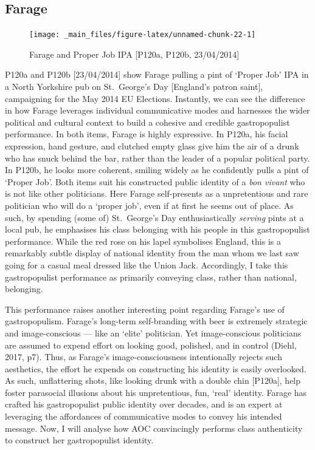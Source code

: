 \documentclass[a4paper, nobind]{templates/ociamthesis}
\begin{document}
\hypertarget{farage-3}{%
\subsection*{Farage}\label{farage-3}}

\begin{figure}
\texttt{[image: \_main\_files/figure-latex/unnamed-chunk-22-1]} \caption{Farage and Proper Job IPA [P120a, P120b, 23/04/2014]}\label{fig:unnamed-chunk-22}
\end{figure}

P120a and P120b {[}23/04/2014{]} show Farage pulling a pint of `Proper Job' IPA in a North Yorkshire pub on St.~George's Day {[}England's patron saint{]}, campaigning for the May 2014 EU Elections. Instantly, we can see the difference in how Farage leverages individual communicative modes and harnesses the wider political and cultural context to build a cohesive and credible gastropopulist performance. In both items, Farage is highly expressive. In P120a, his facial expression, hand gesture, and clutched empty glass give him the air of a drunk who has snuck behind the bar, rather than the leader of a popular political party. In P120b, he looks more coherent, smiling widely as he confidently pulls a pint of `Proper Job'. Both items suit his constructed public identity of a \emph{bon vivant} who is not like other politicians. Here Farage self-presents as a unpretentious and rare politician who will do a `proper job', even if at first he seems out of place. As such, by spending (some of) St.~George's Day enthusiastically \emph{serving} pints at a local pub, he emphasises his class belonging with his people in this gastropopulist performance. While the red rose on his lapel symbolises England, this is a remarkably subtle display of national identity from the man whom we last saw going for a casual meal dressed like the Union Jack. Accordingly, I take this gastropopulist performance as primarily conveying class, rather than national, belonging.

This performance raises another interesting point regarding Farage's use of gastropopulism. Farage's long-term self-branding with beer is extremely strategic and image-conscious --- like an `elite' politician. Yet image-conscious politicians are assumed to expend effort on looking good, polished, and in control (Diehl, 2017, p7). Thus, as Farage's image-consciousness intentionally rejects such aesthetics, the effort he expends on constructing his identity is easily overlooked. As such, unflattering shots, like looking drunk with a double chin {[}P120a{]}, help foster parasocial illusions about his unpretentious, fun, `real' identity. Farage has crafted his gastropopulist public identity over decades, and is an expert at leveraging the affordances of communicative modes to convey his intended message. Now, I will analyse how AOC convincingly performs class authenticity to construct her gastropopulist identity.
\end{document}
